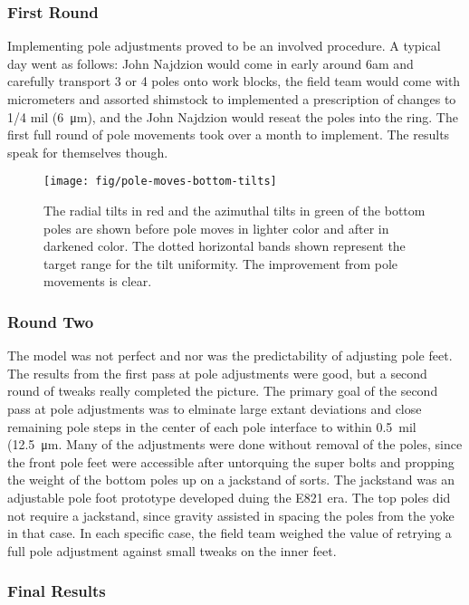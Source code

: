 \subsubsection{First Round}

Implementing pole adjustments proved to be an involved procedure.  A typical day went as follows: John Najdzion would come in early around 6am and carefully transport 3 or 4 poles onto work blocks, the field team would come with micrometers and assorted shimstock to implemented a prescription of changes to 1/4 mil (\SI{6}{\micro\meter}), and the John Najdzion  would reseat the poles into the ring.  The first full round of pole movements took over a month to implement.  The results speak for themselves though.

\begin{figure}
\texttt{[image: fig/pole-moves-bottom-tilts]}
\caption{The radial tilts in red and the azimuthal tilts in green of the bottom poles are shown before pole moves in lighter color and after in darkened color.  The dotted horizontal bands shown represent the target range for the tilt uniformity.  The improvement from pole movements is clear.}
\label{fig:pole-moves-bottom-tilts}
\end{figure}

\subsubsection{Round Two}

The model was not perfect and nor was the predictability of adjusting pole feet.  The results from the first pass at pole adjustments were good, but a second round of tweaks really completed the picture.  The primary goal of the second pass at pole adjustments was to elminate large extant deviations and close remaining pole steps in the center of each pole interface to within \SI{0.5}{mil} (\SI{12.5}{\micro\meter}.  Many of the adjustments were done without removal of the poles, since the front pole feet were accessible after untorquing the super bolts and propping the weight of the bottom poles up on a jackstand of sorts.  The jackstand was an adjustable pole foot prototype developed duing the E821 era.  The top poles did not require a jackstand, since gravity assisted in spacing the poles from the yoke in that case.  In each specific case, the field team weighed the value of retrying a full pole adjustment against small tweaks on the inner feet.

\subsubsection{Final Results}

